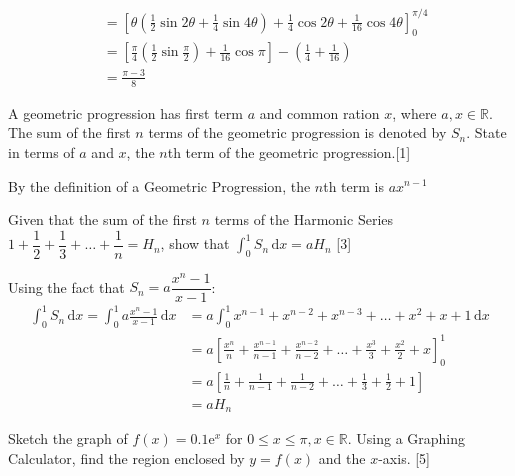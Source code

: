 \documentclass[12pt, a4 paper]{article}
\begin{document}
\begin{outline}[enumerate]
\begin{answer}
\begin{align*}
			                                                                & =[\theta(\frac{1}{2}\sin{2\theta} + \frac{1}{4}\sin{4\theta}) + \frac{1}{4}\cos{2\theta} + \frac{1}{16}\cos{4\theta}]_0^{\pi/4}                                \\
			                                                                & = [\frac{\pi}{4}(\frac{1}{2}\sin{\frac{\pi}{2}})+ \frac{1}{16}\cos{\pi}]- (\frac{1}{4}+\frac{1}{16})                                                           \\
			                                                                & = \frac{\pi-3}{8}
		\end{align*}
	\end{answer}

	\1 A geometric progression has first term $a$ and common ration $x$, where $a,x \in \mathbb{R}$. The sum of the first $n$ terms of the geometric progression is denoted by $S_n$.
	\2 State in terms of $a$ and $x$, the $n$th term of the geometric progression.\hfill[1]
	\begin{answer}
		By the definition of a Geometric Progression, the $n$th term is $ax^{n-1}$
	\end{answer}
	\2 Given that the sum of the first $n$ terms of the Harmonic Series $1+\dfrac{1}{2}+\dfrac{1}{3}+\dots+\dfrac{1}{n}=H_n$, show that $\int_0^1 S_n\,\mathrm{d}x=aH_n$ \hfill[3]
	\begin{answer}
		Using the fact that $S_n = a\dfrac{x^n-1}{x-1}$:
		\begin{align*}
			\int_0^1 S_n\,\mathrm{d}x = \int_0^1 a\frac{x^n-1}{x-1}\,\mathrm{d}x & = a\int_0^1 x^{n-1}+x^{n-2}+x^{n-3}+\dots+x^2+x+1\,\mathrm{d}x                                     \\
			                                                                     & = a[\frac{x^n}{n}+\frac{x^{n-1}}{n-1}+\frac{x^{n-2}}{n-2}+\dots+\frac{x^3}{3}+\frac{x^2}{2}+x]_0^1 \\
			                                                                     & = a[\frac{1}{n}+\frac{1}{n-1}+\frac{1}{n-2}+\dots+\frac{1}{3}+\frac{1}{2}+1]                       \\
			                                                                     & = aH_n
		\end{align*}
	\end{answer}
	\1 Sketch the graph of $f(x) = 0.1\mathrm{e}^x$ for $0\leq x \leq \pi, x\in\mathbb{R}$. Using a Graphing Calculator, find the region enclosed by $y=f(x)$ and the $x$-axis. \hfill[5]
	\begin{answer}

\end{answer}
\end{outline}
\end{document}
